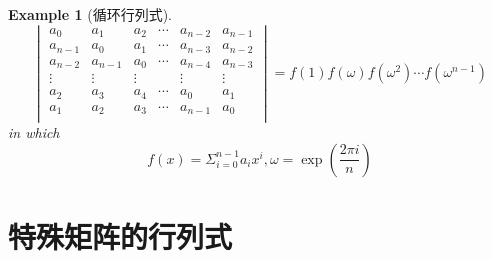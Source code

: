 \documentclass[onecolumn]{ctexart}
\newtheorem{example}{Example}
\begin{document}
\begin{example}[循环行列式]
\[
  \begin{vmatrix}
    a_0 & a_1 & a_2 & \cdots & a_{n-2} & a_{n-1} \\
    a_{n-1} & a_0 & a_1 & \cdots & a_{n-3} & a_{n-2} \\
    a_{n-2} & a_{n-1} & a_0 & \cdots & a_{n-4} & a_{n-3} \\
    \vdots & \vdots & \vdots & & \vdots & \vdots \\
    a_2 & a_3 & a_4 & \cdots & a_0 & a_1 \\
    a_1 & a_2 & a_3 & \cdots & a_{n-1} & a_0 \\
  \end{vmatrix} = f(1)f(\omega)f(\omega^2) \cdots f(\omega^{n-1})
\]
in which
\[
  f(x) = \Sigma_{i=0}^{n-1} a_i x^i, \omega = \exp(\frac{2\pi i}{n})
\]
\end{example}

\section{特殊矩阵的行列式}
\end{document}
